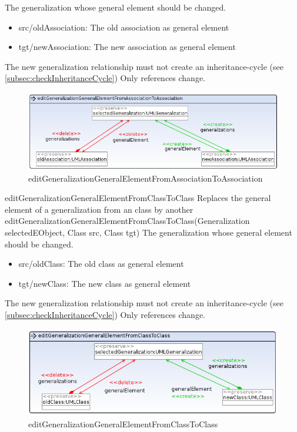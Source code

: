 {The generalization whose general element should be changed.} {
\begin{itemize}
 \item src/oldAssociation: The old association as general element
 \item tgt/newAssociation: The new association as general element
\end{itemize}
}
{The new generalization relationship must not create an inheritance-cycle (see
\ref{subsec:checkInheritanceCycle})}
{Only references change.}
\begin{figure}[H]
  \centering
  \includegraphics[width=1.0\textwidth]{pics/editGeneralizationGeneralElementFromAssociationToAssociation.png}
  \caption{editGeneralizationGeneralElementFromAssociationToAssociation}
  \label{editGeneralizationGeneralElementFromAssociationToAssociation}
\end{figure}
\op
{editGeneralizationGeneralElementFromClassToClass}
{Replaces the general element of a generalization from an class by
another}
{editGeneralizationGeneralElementFromClassToClass(Generalization
selectedEObject, Class src, Class tgt)}
{The generalization whose general element should be changed.} {
\begin{itemize}
 \item src/oldClass: The old class as general element
 \item tgt/newClass: The new class as general element
\end{itemize}
}
{The new generalization relationship must not create an inheritance-cycle (see
\ref{subsec:checkInheritanceCycle})}
{Only references change.}
\begin{figure}[H]
  \centering
  \includegraphics[width=1.0\textwidth]{pics/editGeneralizationGeneralElementFromClassToClass.png}
  \caption{editGeneralizationGeneralElementFromClassToClass}
  \label{editGeneralizationGeneralElementFromClassToClass}
\end{figure}
